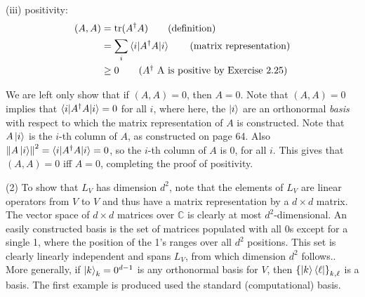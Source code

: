 \indent(iii) positivity:
\begin{align*}
	(A, A) &= \operatorname{tr} (A^\dagger A) \tag{definition}\\
		&= \sum_i \braket{ i | A^\dagger A | i } \tag{matrix representation} \\
		&\geq 0 \tag{$A^\dagger$ A is positive by Exercise 2.25}
\end{align*}
\begin{adjustwidth}{\parindent}{} We are left only show that if $(A, A) = 0$, then $A = 0$. Note that $(A, A) = 0$ implies that $\braket{i | A^\dagger A | i} = 0$ for all $i$, where here, the $\ket{i}$ are an orthonormal \textit{basis} with respect to which the matrix representation of $A$ is constructed.  Note that $A\ket{i}$ is the $i$-th column of $A$, as constructed on page 64.  Also $\left\lVert A\ket{i}\right\rVert^2 = \braket{i | A^\dagger A| i} = 0$, so the $i$-th column of $A$ is $0$, for all $i$.  This gives that $(A, A) = 0$ iff $A=0$, completing the proof of positivity.\end{adjustwidth}

\noindent(2) To show that $L_V$ has dimension $d^2$, note that the elements of $L_V$ are linear operators from $V$ to $V$ and thus have a  matrix representation by a $d\times d$ matrix.    The vector space of $d\times d$ matrices over $\mathbb{C}$ is clearly at most $d^2$-dimensional.   An easily constructed basis is the set of matrices populated with all $0$s except for a single 1, where the position of the 1's ranges over all $d^2$ positions. This set is clearly linearly independent and spans $L_V$, from which dimension $d^2$ follows..  More generally, if $\ket{k}_k=0^{d-1}$ is any orthonormal basis for $V$, then $\left\{\ket{k}\bra{\ell}\right\}_{k,\ell}$ is a basis.  The first example is produced used the standard (computational) basis.

